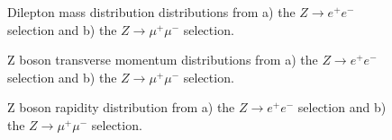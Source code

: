 \begin{figure}[h]
\begin{minipage}[h]{0.49\linewidth}
\end{minipage}
\hfill
\begin{minipage}[h]{0.49\linewidth}
\end{minipage}
\caption{Dilepton mass distribution distributions from a) the $Z\to e^{+}e^{-}$ selection and b) the $Z\to \mu^{+}\mu^{-}$ selection.}
\label{fig:CPMassZ}
\end{figure}

\begin{figure}[h]
\begin{minipage}[h]{0.49\linewidth}
\end{minipage}
\hfill
\begin{minipage}[h]{0.49\linewidth}
\end{minipage}

\caption{ Z boson transverse momentum distributions from a) the $Z\to e^{+}e^{-}$ selection and b) the $Z\to \mu^{+}\mu^{-}$ selection.}
\end{figure}


\begin{figure}[h]
\begin{minipage}[h]{0.49\linewidth}
\end{minipage}
\hfill
\begin{minipage}[h]{0.49\linewidth}
\end{minipage}

\caption{ Z boson rapidity distribution from a) the $Z\to e^{+}e^{-}$ selection and b) the $Z\to \mu^{+}\mu^{-}$ selection.}
\label{ris:Zll2}
\end{figure}
